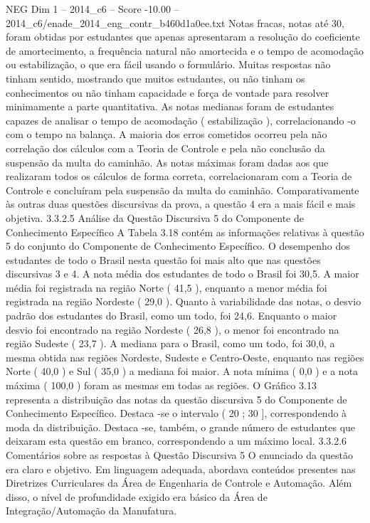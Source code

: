 \begin{textsample}{NEG Dim 1 – 2014\_c6 – Score -10.00 – 2014\_c6/enade\_2014\_eng\_contr\_b460d1a0ee.txt}
Notas fracas, notas até 30, foram obtidas por estudantes que apenas apresentaram a resolução do coeficiente de amortecimento, a frequência natural não amortecida e o tempo de acomodação ou estabilização, o que era fácil usando o formulário.
Muitas respostas não tinham sentido, mostrando que muitos estudantes, ou não tinham os conhecimentos ou não tinham capacidade e força de vontade para resolver minimamente a parte quantitativa.
As notas medianas foram de estudantes capazes de analisar o tempo de acomodação ( estabilização ), correlacionando -o com o tempo na balança.
A maioria dos erros cometidos ocorreu pela não correlação dos cálculos com a Teoria de Controle e pela não conclusão da suspensão da multa do caminhão.
As notas máximas foram dadas aos que realizaram todos os cálculos de forma correta, correlacionaram com a Teoria de Controle e concluíram pela suspensão da multa do caminhão.
Comparativamente às outras duas questões discursivas da prova, a questão 4 era a mais fácil e mais objetiva. 3.3.2.5 Análise da Questão Discursiva 5 do Componente de Conhecimento Específico A Tabela 3.18 contém as informações relativas à questão 5 do conjunto do Componente de Conhecimento Específico.
O desempenho dos estudantes de todo o Brasil nesta questão foi mais alto que nas questões discursivas 3 e 4.
A nota média dos estudantes de todo o Brasil foi 30,5.
A maior média foi registrada na região Norte ( 41,5 ), enquanto a menor média foi registrada na região Nordeste ( 29,0 ).
Quanto à variabilidade das notas, o desvio padrão dos estudantes do Brasil, como um todo, foi 24,6.
Enquanto o maior desvio foi encontrado na região Nordeste ( 26,8 ), o menor foi encontrado na região Sudeste ( 23,7 ).
A mediana para o Brasil, como um todo, foi 30,0, a mesma obtida nas regiões Nordeste, Sudeste e Centro-Oeste, enquanto nas regiões Norte ( 40,0 ) e Sul ( 35,0 ) a mediana foi maior.
A nota mínima ( 0,0 ) e a nota máxima ( 100,0 ) foram as mesmas em todas as regiões.
O Gráfico 3.13 representa a distribuição das notas da questão discursiva 5 do Componente de Conhecimento Específico.
Destaca -se o intervalo ( 20 ; 30 ], correspondendo à moda da distribuição.
Destaca -se, também, o grande número de estudantes que deixaram esta questão em branco, correspondendo a um máximo local. 3.3.2.6 Comentários sobre as respostas à Questão Discursiva 5 O enunciado da questão era claro e objetivo.
Em linguagem adequada, abordava conteúdos presentes nas Diretrizes Curriculares da Área de Engenharia de Controle e Automação.
Além disso, o nível de profundidade exigido era básico da Área de Integração/Automação da Manufatura.

\end{textsample}
